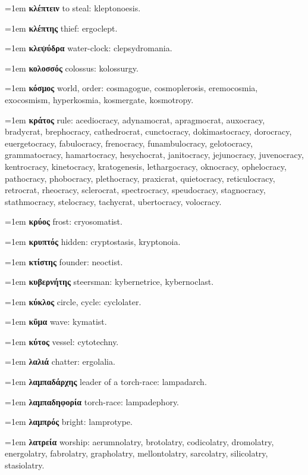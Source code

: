 \hangindent=1em \textbf{κλέπτειν} to steal: kleptonoesis.\par
\hangindent=1em \textbf{κλέπτης} thief: ergoclept.\par
\hangindent=1em \textbf{κλεψύδρα} water-clock: clepsydromania.\par
\hangindent=1em \textbf{κολοσσός} colossus: kolossurgy.\par
\hangindent=1em \textbf{κόσμος} world, order: cosmagogue, cosmoplerosis, eremocosmia, exocosmism, hyperkosmia, kosmergate, kosmotropy.\par
\hangindent=1em \textbf{κράτος} rule: acediocracy, adynamocrat, apragmocrat, auxocracy, bradycrat, brephocracy, cathedrocrat, cunctocracy, dokimastocracy, dorocracy, euergetocracy, fabulocracy, frenocracy, funambulocracy, gelotocracy, grammatocracy, hamartocracy, hesychocrat, janitocracy, jejunocracy, juvenocracy, kentrocracy, kinetocracy, kratogenesis, lethargocracy, oknocracy, ophelocracy, pathocracy, phobocracy, plethocracy, praxicrat, quietocracy, reticulocracy, retrocrat, rheocracy, sclerocrat, spectrocracy, speudocracy, stagnocracy, stathmocracy, stelocracy, tachycrat, ubertocracy, volocracy.\par
\hangindent=1em \textbf{κρύος} frost: cryosomatist.\par
\hangindent=1em \textbf{κρυπτός} hidden: cryptostasis, kryptonoia.\par
\hangindent=1em \textbf{κτίστης} founder: neoctist.\par
\hangindent=1em \textbf{κυβερνήτης} steersman: kybernetrice, kybernoclast.\par
\hangindent=1em \textbf{κύκλος} circle, cycle: cyclolater.\par
\hangindent=1em \textbf{κῦμα} wave: kymatist.\par
\hangindent=1em \textbf{κύτος} vessel: cytotechny.\par
\hangindent=1em \textbf{λαλιά} chatter: ergolalia.\par
\hangindent=1em \textbf{λαμπαδάρχης} leader of a torch-race: lampadarch.\par
\hangindent=1em \textbf{λαμπαδηφορία} torch-race: lampadephory.\par
\hangindent=1em \textbf{λαμπρός} bright: lamprotype.\par
\hangindent=1em \textbf{λατρεία} worship: aerumnolatry, brotolatry, codicolatry, dromolatry, energolatry, fabrolatry, grapholatry, mellontolatry, sarcolatry, silicolatry, stasiolatry.\par
